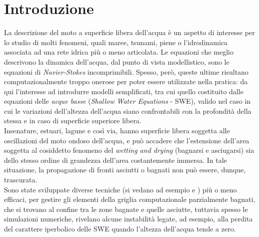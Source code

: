 \documentclass[a4paper,12pt,oneside]{book}
\theoremstyle{definition}
\begin{document}
\chapter{Introduzione}
La descrizione del moto a superficie libera dell'acqua \`e un aspetto di interesse per lo studio di molti fenomeni, quali maree, tsunami, piene o l'idrodinamica associata ad una rete idrica pi\`u o meno articolata. 
Le equazioni che meglio descrivono la dinamica dell'acqua, dal punto di vista modellistico, sono le equazioni di \emph{Navier-Stokes} incomprimibili. Spesso, per\`o, queste ultime risultano computazionalmente troppo onerose per poter essere utilizzate nella pratica: da qui l'interesse ad introdurre modelli semplificati, tra cui quello costituito dalle equazioni delle \emph{acque basse} (\emph{Shallow Water Equations} - SWE), valido nel caso in cui le variazioni dell'altezza dell'acqua siano confrontabili con la profondit\`a della stessa e in caso di superficie superiore libera.\\
Insenature, estuari, lagune e cos\`i via, hanno superficie libera soggetta alle oscillazioni del moto ondoso dell'acqua, e pu\`o accadere che l'estensione dell'area soggetta al cosiddetto fenomeno del \emph{wetting and drying} (bagnarsi e asciugarsi) sia dello stesso ordine di grandezza dell'area costantemente immersa.
In tale situazione, la propagazione di fronti asciutti o bagnati non pu\`o essere, dunque, trascurata.\\
Sono state sviluppate diverse tecniche (si vedano ad esempio \cite{Balzano1998} \cite{Medeiros2012} e \cite{Horritt2002}) pi\`u o meno efficaci,  per gestire gli elementi della griglia computazionale parzialmente bagnati, che si trovano al confine tra le zone bagnate e quelle asciutte, tuttavia spesso le simulazioni numeriche, rivelano alcune instabilit\`a legate, ad esempio,  alla perdita del carattere iperbolico delle SWE quando l'altezza dell'acqua tende a zero.

\mainmatter







\end{document}
